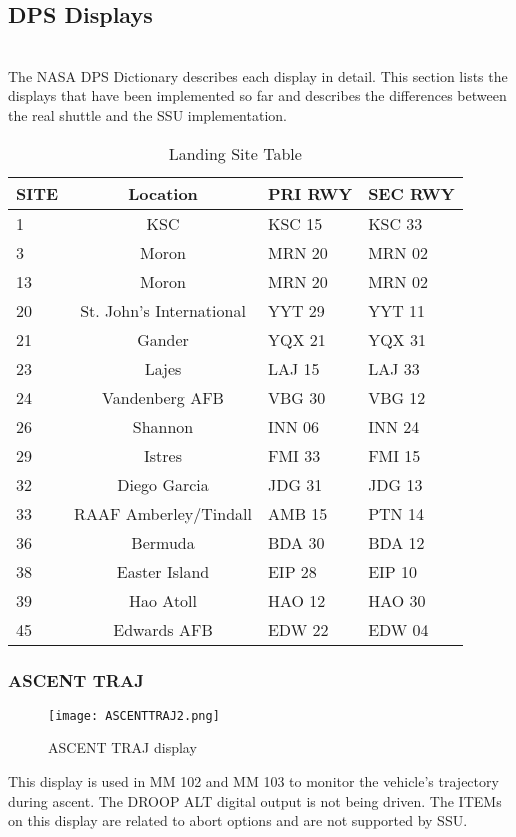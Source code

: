 \documentclass[Space_Shuttle_Ultra_Manual.tex]{subfiles}
\begin{document}
\subsection{DPS Displays}
\begin{multicols*}{2}
\renewcommand{\cfttoctitlefont}{\bf}
\localtableofcontents
\label{sec:dps-displays}
\noindent
\\
The NASA DPS Dictionary describes each display in detail. This section lists the displays that have been implemented so far and describes the differences between the real shuttle and the SSU implementation.

\begin{table*}[tb]
  \centering
  \begin{tabular}{l | c l l}
    \textbf{SITE} & \textbf{Location} & \textbf{PRI RWY} & \textbf{SEC RWY} \\
    \hline
    1 & KSC & KSC 15 & KSC 33 \\
    3 & Moron & MRN 20 & MRN 02 \\
    13 & Moron & MRN 20 & MRN 02 \\
    20 & St. John's International & YYT 29 & YYT 11 \\
		21 & Gander & YQX 21 & YQX 31 \\
    23 & Lajes & LAJ 15 & LAJ 33 \\
    24 & Vandenberg AFB & VBG 30 & VBG 12 \\
		26 & Shannon & INN 06 & INN 24 \\
    29 & Istres & FMI 33 & FMI 15 \\
    32 & Diego Garcia & JDG 31 & JDG 13 \\
    33 & RAAF Amberley/Tindall & AMB 15 & PTN 14 \\
    36 & Bermuda & BDA 30 & BDA 12 \\
    38 & Easter Island & EIP 28 & EIP 10 \\
    39 & Hao Atoll & HAO 12 & HAO 30 \\
    45 & Edwards AFB & EDW 22 & EDW 04
  \end{tabular}
  \caption{Landing Site Table}
  \label{tab:LandingSites}
\end{table*}

\subsubsection{ASCENT TRAJ}
\begin{figure}[H]
  \texttt{[image: ASCENTTRAJ2.png]}
  \caption{ASCENT TRAJ display}
  \label{fig:ASCENT_TRAJ}
\end{figure}
This display is used in MM 102 and MM 103 to monitor the vehicle's trajectory during ascent. The DROOP ALT digital output is not being driven. The ITEMs on this display are related to abort options and are not supported by SSU.


\end{multicols*}
\end{document}
